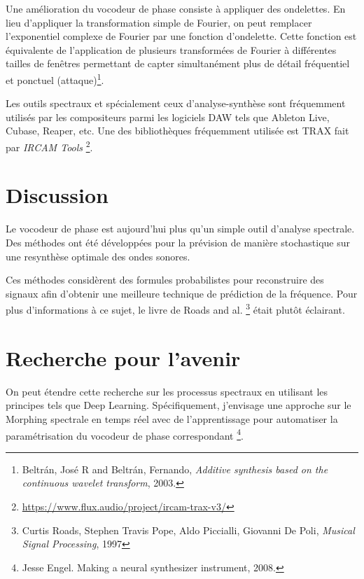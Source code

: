 Une amélioration du vocodeur de phase consiste à appliquer des ondelettes. En lieu d'appliquer la transformation simple de Fourier, on peut remplacer l'exponentiel complexe de Fourier par une fonction d'ondelette. Cette fonction est équivalente de l'application de plusieurs transformées de Fourier à différentes tailles de fenêtres permettant de capter simultanément plus de détail fréquentiel et ponctuel (attaque)\footnote{{Beltr{\'a}n, Jos{\'e} R and Beltr{\'a}n, Fernando}, \textit{Additive synthesis based on the continuous wavelet transform}, 2003.\nocite{beltran2003additive}}. 

Les outils spectraux et spécialement ceux d'analyse-synthèse sont fréquemment utilisés par les compositeurs parmi les logiciels DAW tels que Ableton Live, Cubase, Reaper, etc. Une des  bibliothèques fréquemment utilisée est TRAX fait par \textit{IRCAM Tools} \footnote{\href{https://www.flux.audio/project/ircam-trax-v3/}{https://www.flux.audio/project/ircam-trax-v3/}}.

\section{Discussion}

Le vocodeur de phase est aujourd'hui plus qu'un simple outil d'analyse spectrale. Des méthodes ont été développées pour la prévision de manière stochastique sur une resynthèse optimale des ondes sonores.

Ces méthodes considèrent des formules probabilistes pour reconstruire des signaux afin d’obtenir une meilleure technique de prédiction de la fréquence. Pour plus d'informations à ce sujet, le livre de Roads and al. \footnote{Curtis Roads, Stephen Travis Pope, Aldo Piccialli, Giovanni De Poli, \textit{Musical Signal Processing}, 1997 \nocite{Roads97}} était plutôt éclairant.

\section{Recherche pour l'avenir}

On peut étendre cette recherche sur les processus spectraux en utilisant les principes tels que Deep Learning. Spécifiquement, j'envisage une approche sur le Morphing spectrale en temps réel avec de l'apprentissage pour automatiser la paramétrisation du vocodeur de phase correspondant \footnote{Jesse Engel. Making a neural synthesizer instrument, 2008.}. 


